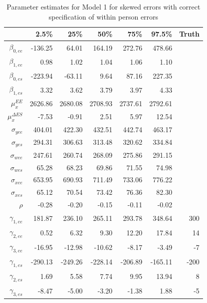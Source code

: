 \documentclass[11pt]{article}\usepackage[]{graphicx}\usepackage[]{color}
\begin{document}
\begin{table}[ht]
\centering
\begin{tabular}{rrrrrr|r}
  \hline
 & 2.5\% & 25\% & 50\% & 75\% & 97.5\% & Truth\\ 
  \hline
$\beta_{0,ee}$ & -136.25 & 64.01 & 164.19 & 272.76 & 478.66 \\ 
  $\beta_{1,ee}$ & 0.98 & 1.02 & 1.04 & 1.06 & 1.10 \\ 
  $\beta_{0,es}$ & -223.94 & -63.11 & 9.64 & 87.16 & 227.35 \\ 
  $\beta_{1,es}$ & 3.32 & 3.62 & 3.79 & 3.97 & 4.33 \\ 
  $\mu_x^{EE}$ & 2626.86 & 2680.08 & 2708.93 & 2737.61 & 2792.61 \\ 
  $\mu_x^{\Delta ES}$ & -7.53 & -0.91 & 2.51 & 5.97 & 12.54 \\ 
  $\sigma_{yee}$ & 404.01 & 422.30 & 432.51 & 442.74 & 463.17 \\ 
  $\sigma_{yes}$ & 294.31 & 306.63 & 313.48 & 320.62 & 334.84 \\ 
  $\sigma_{wee}$ & 247.61 & 260.74 & 268.09 & 275.86 & 291.15 \\ 
  $\sigma_{wes}$ & 65.28 & 68.23 & 69.86 & 71.55 & 74.98 \\ 
  $\sigma_{xee}$ & 653.95 & 690.93 & 711.49 & 733.06 & 776.22 \\ 
  $\sigma_{xes}$ & 65.12 & 70.54 & 73.42 & 76.36 & 82.30 \\ 
  $\rho$ & -0.28 & -0.20 & -0.15 & -0.11 & -0.02 \\ 
  $\gamma_{1,ee}$ & 181.87 & 236.10 & 265.11 & 293.78 & 348.64 & 300\\ 
  $\gamma_{2,ee}$ & 0.52 & 6.32 & 9.30 & 12.20 & 17.84 & 14\\ 
  $\gamma_{3,ee}$ & -16.95 & -12.98 & -10.62 & -8.17 & -3.49 & -7\\ 
  $\gamma_{1,es}$ & -290.13 & -249.26 & -228.14 & -206.89 & -165.11 & -200 \\ 
  $\gamma_{2,es}$ & 1.69 & 5.58 & 7.74 & 9.95 & 13.94 & 8 \\ 
  $\gamma_{3,es}$ & -8.47 & -5.00 & -3.20 & -1.38 & 1.88 & -5\\ 
  \hline
   \end{tabular}
\caption{Parameter estimates for Model 1 for skewed errors with correct specification of within person errors}
\label{m1swpestimates}
\end{table}
\end{document}
